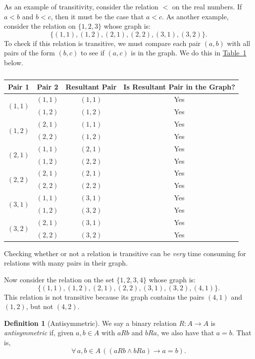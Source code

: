 \documentclass[11pt,oneside]{book}
\theoremstyle{definition}
\newtheorem{defn}[thm]{Definition}
\begin{document}
As an example of transitivity, consider the relation $<$ on the real numbers.
If $a < b$ and $b < c$, then it must be the case that $a < c$.
As another example, consider the relation on $\{ 1, 2, 3 \}$ whose graph is:
\[ \{ (1, 1), (1, 2), (2, 1), (2, 2), (3, 1), (3, 2) \}. \]
To check if this relation is transitive, we must compare each pair $(a, b)$ with all pairs of the form $(b, c)$ to see if $(a, c)$ is in the graph.
We do this in \hyperref[tab:Transitivity]{Table~\ref*{tab:Transitivity}} below.
\begin{table}[H]
\centering
\begin{tabular}{c|c|c|c}
    Pair 1 & Pair 2 & Resultant Pair & Is Resultant Pair in the Graph? \\
    \hline
    \multirow{2}{*}{$(1, 1)$} & $(1, 1)$ & $(1, 1)$ & Yes \\
    & $(1, 2)$ & $(1, 2)$ & Yes \\
    \hline
    \multirow{2}{*}{$(1, 2)$} & $(2, 1)$ & $(1, 1)$ & Yes \\
    & $(2, 2)$ & $(1, 2)$ & Yes \\
    \hline
    \multirow{2}{*}{$(2, 1)$} & $(1, 1)$ & $(2, 1)$ & Yes \\
    & $(1, 2)$ & $(2, 2)$ & Yes \\
    \hline
    \multirow{2}{*}{$(2, 2)$} & $(2, 1)$ & $(2, 1)$ & Yes \\
    & $(2, 2)$ & $(2, 2)$ & Yes \\
    \hline
    \multirow{2}{*}{$(3, 1)$} & $(1, 1)$ & $(3, 1)$ & Yes \\
    & $(1, 2)$ & $(3, 2)$ & Yes \\
    \hline
    \multirow{2}{*}{$(3, 2)$} & $(2, 1)$ & $(3, 1)$ & Yes \\
    & $(2, 2)$ & $(3, 2)$ & Yes
\end{tabular}
\caption{} \label{tab:Transitivity}
\end{table}

Checking whether or not a relation is transitive can be \emph{very} time consuming for relations with many pairs in their graph.

Now consider the relation on the set $\{ 1, 2, 3, 4 \}$ whose graph is:
\[ \{ (1, 1), (1, 2), (2, 1), (2, 2), (3, 1), (3, 2), (4, 1) \}. \]
This relation is not transitive because its graph contains the pairs $(4, 1)$ and $(1, 2)$, but not $(4, 2)$.

\begin{defn}[Antisymmetric]
    We say a binary relation $R: A \to A$ is \emph{antisymmetric} if, given $a, b \in A$ with $a R b$ and $b R a$, we also have that $a = b$.
    That is,
    \[ \forall\, a, b \in A\, ((a R b \land b R a) \rightarrow a = b). \]
\end{defn}
\end{document}
